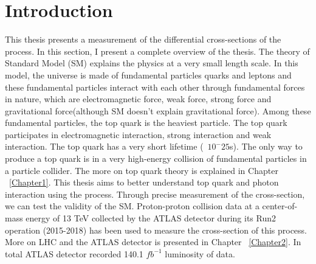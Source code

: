 
\chapter{Introduction} %

\label{Chapter0} %

This thesis presents a measurement of the differential cross-sections of the \tty process. In this section, I present a complete overview of the thesis. The theory of Standard Model (SM) explains the physics at a very small length scale. In this model, the universe is made of fundamental particles quarks and leptons and these fundamental particles interact with each other through fundamental forces in nature, which are electromagnetic force, weak force, strong force and gravitational force(although SM doesn't explain gravitational force). Among these fundamental particles, the top quark is the heaviest particle. The top quark participates in electromagnetic interaction, strong interaction and weak interaction. The top quark has a very short lifetime (~$10^-{25}$s). The only way to produce a top quark is in a very high-energy collision of fundamental particles in a particle collider. The more on top quark theory is explained in Chapter ~\ref{Chapter1}.
This thesis aims to better understand top quark and photon interaction using the \tty process. Through precise measurement of the \tty cross-section, we can test the validity of the SM. Proton-proton collision data at a center-of-mass energy of 13 TeV collected by the ATLAS detector during its Run2 operation (2015-2018) has been used to measure the cross-section of this process. More on LHC and the ATLAS detector is presented in Chapter ~\ref{Chapter2}. In total ATLAS detector recorded 140.1 $fb^{-1}$ luminosity of data.



